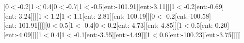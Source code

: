 
[0$<$-0.2[1$<$0.4[0$<$-0.7[1$<$-0.5[ent:-101.91][ent:-3.11]][1$<$-0.2[ent:-0.69][ent:-3.24]]][1$<$1.2[1$<$1.1[ent:-2.81][ent:-100.19]][0$<$-0.2[ent:-100.58][ent:-101.91]]]][0$<$0.5[1$<$-0.4[0$<$0.2[ent:-4.73][ent:-4.85]][1$<$0.5[ent:-0.20][ent:-4.09]]][1$<$0.4[1$<$-0.1[ent:-3.55][ent:-4.49]][1$<$0.6[ent:-100.23][ent:-3.75]]]]]
